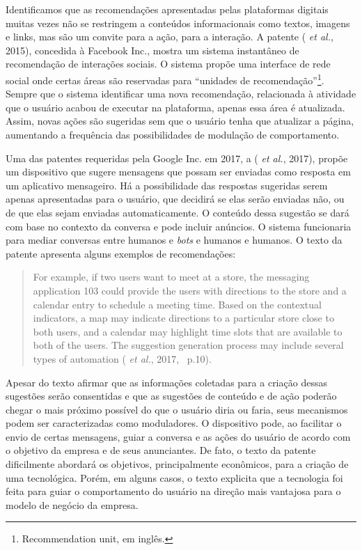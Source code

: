 Identificamos que as recomendações apresentadas pelas plataformas
digitais muitas vezes não se restringem a conteúdos informacionais como
textos, imagens e links, mas são um convite para a ação, para a
interação. A patente  ( \emph{et al.}, 2015),
concedida à Facebook Inc., mostra um sistema instantâneo de recomendação
de interações sociais. O sistema propõe uma interface de rede social
onde certas áreas são reservadas para ``unidades de
recomendação''\footnote{Recommendation unit, em inglês.}. Sempre que o
sistema identificar uma nova recomendação, relacionada à atividade que o
usuário acabou de executar na plataforma, apenas essa área é atualizada.
Assim, novas ações são sugeridas sem que o usuário tenha que atualizar a
página, aumentando a frequência das possibilidades de modulação de
comportamento.

Uma das patentes requeridas pela Google Inc. em 2017, a 
( \emph{et al.}, 2017), propõe um dispositivo que sugere
mensagens que possam ser enviadas como resposta em um aplicativo
mensageiro. Há a possibilidade das respostas sugeridas serem apenas
apresentadas para o usuário, que decidirá se elas serão enviadas não, ou
de que elas sejam enviadas automaticamente. O conteúdo dessa sugestão se
dará com base no contexto da conversa e pode incluir anúncios. O sistema
funcionaria para mediar conversas entre humanos e \emph{bots} e humanos
e humanos. O texto da patente apresenta alguns exemplos de
recomendações:

\begin{quote}
For example, if two users want to meet at a store, the messaging
application 103 could provide the users with directions to the store and
a calendar entry to schedule a meeting time. Based on the contextual
indicators, a map may indicate directions to a particular store close to
both users, and a calendar may highlight time slots that are available
to both of the users. The suggestion generation process may include
several types of automation ( \emph{et al.}, 2017,~ p.10).
\end{quote}

Apesar do texto afirmar que as informações coletadas para a criação
dessas sugestões serão consentidas e que as sugestões de conteúdo e de
ação poderão chegar o mais próximo possível do que o usuário diria ou
faria, seus mecanismos podem ser caracterizadas como moduladores. O
dispositivo pode, ao facilitar o envio de certas mensagens, guiar a
conversa e as ações do usuário de acordo com o objetivo da empresa e de
seus anunciantes. De fato, o texto da patente dificilmente abordará os
objetivos, principalmente econômicos, para a criação de uma tecnológica.
Porém, em alguns casos, o texto explicita que a tecnologia foi feita
para guiar o comportamento do usuário na direção mais vantajosa para o
modelo de negócio da empresa.

